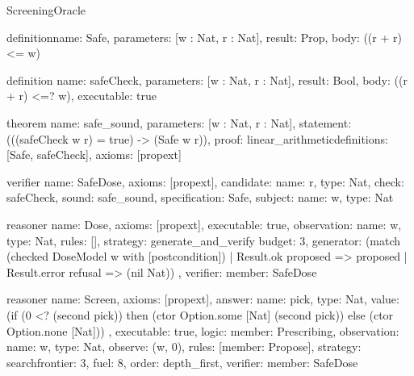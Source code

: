 \begin{lexlean}{ScreeningOracle}
\begin{semanticmodule}
definition{name: Safe, parameters: [w : Nat, r : Nat], result: Prop, body: ((r + r) <= w)}

definition{
  name: safeCheck,
  parameters: [w : Nat, r : Nat],
  result: Bool,
  body: ((r + r) <=? w),
  executable: true
}

theorem{
  name: safe_sound,
  parameters: [w : Nat, r : Nat],
  statement: (((safeCheck w r) = true) -> (Safe w r)),
  proof: linear_arithmetic{definitions: [Safe, safeCheck]},
  axioms: [propext]
}

verifier{
  name: SafeDose,
  axioms: [propext],
  candidate: {name: r, type: Nat},
  check: safeCheck,
  sound: safe_sound,
  specification: Safe,
  subject: {name: w, type: Nat}
}

reasoner{
  name: Dose,
  axioms: [propext],
  executable: true,
  observation: {name: w, type: Nat},
  rules: [],
  strategy: generate_and_verify{
    budget: 3,
    generator: (match (checked DoseModel w with [postcondition])
      | Result.ok proposed => proposed
      | Result.error refusal => (nil Nat))
  },
  verifier: {member: SafeDose}
}

reasoner{
  name: Screen,
  axioms: [propext],
  answer: {
    name: pick,
    type: Nat,
    value: (if (0 <? (second pick)) then (ctor Option.some [Nat] (second pick)) else (ctor Option.none [Nat]))
  },
  executable: true,
  logic: {member: Prescribing},
  observation: {name: w, type: Nat},
  observe: (w, 0),
  rules: [{member: Propose}],
  strategy: search{frontier: 3, fuel: 8, order: depth_first},
  verifier: {member: SafeDose}
}
\end{semanticmodule}
\end{lexlean}
